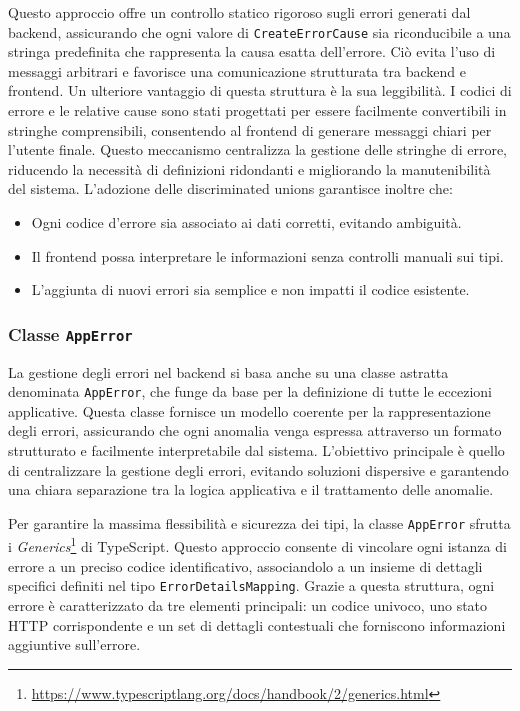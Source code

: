 
%
Questo approccio offre un controllo statico rigoroso sugli errori generati dal backend, assicurando che ogni valore di \texttt{CreateErrorCause} sia riconducibile a una stringa predefinita che rappresenta la causa esatta dell’errore. Ciò evita l’uso di messaggi arbitrari e favorisce una comunicazione strutturata tra backend e frontend.
%
Un ulteriore vantaggio di questa struttura è la sua leggibilità. I codici di errore e le relative cause sono stati progettati per essere facilmente convertibili in stringhe comprensibili, consentendo al frontend di generare messaggi chiari per l’utente finale. Questo meccanismo centralizza la gestione delle stringhe di errore, riducendo la necessità di definizioni ridondanti e migliorando la manutenibilità del sistema.
%
L’adozione delle discriminated unions garantisce inoltre che:
\begin{itemize}
  \item Ogni codice d’errore sia associato ai dati corretti, evitando ambiguità.
  \item Il frontend possa interpretare le informazioni senza controlli manuali sui tipi.
  \item L’aggiunta di nuovi errori sia semplice e non impatti il codice esistente.
\end{itemize}

\subsubsection{Classe \texttt{AppError}}
La gestione degli errori nel backend si basa anche su una classe astratta denominata \texttt{AppError}, che funge da base per la definizione di tutte le eccezioni applicative. Questa classe fornisce un modello coerente per la rappresentazione degli errori, assicurando che ogni anomalia venga espressa attraverso un formato strutturato e facilmente interpretabile dal sistema. L'obiettivo principale è quello di centralizzare la gestione degli errori, evitando soluzioni dispersive e garantendo una chiara separazione tra la logica applicativa e il trattamento delle anomalie.

Per garantire la massima flessibilità e sicurezza dei tipi, la classe \texttt{AppError} sfrutta i \textit{Generics}\footnote{\url{https://www.typescriptlang.org/docs/handbook/2/generics.html}} di TypeScript. Questo approccio consente di vincolare ogni istanza di errore a un preciso codice identificativo, associandolo a un insieme di dettagli specifici definiti nel tipo \texttt{ErrorDetailsMapping}. Grazie a questa struttura, ogni errore è caratterizzato da tre elementi principali: un codice univoco, uno stato HTTP corrispondente e un set di dettagli contestuali che forniscono informazioni aggiuntive sull'errore.

